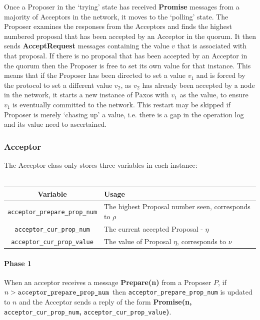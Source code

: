 \documentclass[12pt,twoside,notitlepage]{report}
\newcommand{\msg}[1] {{\bf #1}}         %
\begin{document}
Once a Proposer in the `trying' state has received \msg{Promise} messages from a majority of
Acceptors in the network, it moves to the `polling' state. The Proposer examines the responses
from the Acceptors and finds the highest numbered proposal that has been accepted by an Acceptor
in the quorum. It then sends \msg{AcceptRequest} messages containing the value $v$ that is
associated with that proposal. If there is no proposal that has been accepted by an Acceptor in
the quorum then the Proposer is free to set its own value for that instance. This means that if
the Proposer has been directed to set a value $v_1$ and is forced by the protocol to set a
different value $v_2$, as $v_2$ has already been accepted by a node in the network, it starts a
new instance of Paxos with $v_1$ as the value, to ensure $v_1$ is eventually committed to the
network. This restart may be skipped if Proposer is merely `chasing up' a value, i.e. there is a gap in
the operation log and its value need to ascertained.

\subsubsection{Acceptor}

The Acceptor class only stores three variables in each instance:
\\
\\
\begin{tabular}{ | c | p{8cm} | }
  \hline
  {\bf Variable} & {\bf Usage} \\ \hline
  \verb+acceptor_prepare_prop_num+ & The highest Proposal number seen, corresponds to $\rho$ \\ \hline
  \verb+acceptor_cur_prop_num+ & The current accepted Proposal - $\eta$ \\ \hline
  \verb+acceptor_cur_prop_value+ & The value of Proposal $\eta$, corresponds to $\nu$ \\ \hline
\end{tabular}

\paragraph{Phase 1}

When an acceptor receives a message \msg{Prepare(n)} from a Proposer $P$, if $n >
\verb|acceptor_prepare_prop_num|$ then \verb|acceptor_prepare_prop_num| is updated to $n$ and the
Acceptor sends a reply of the form \msg{Promise(n, }\verb+acceptor_cur_prop_num+{\bf,}
\verb+acceptor_cur_prop_value+{\bf)}.
\end{document}

